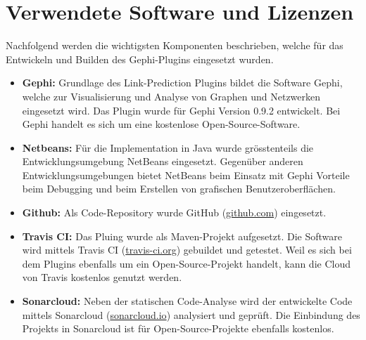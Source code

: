 \section{Verwendete Software und Lizenzen}

Nachfolgend werden die wichtigsten Komponenten beschrieben, welche für das Entwickeln und Builden des Gephi-Plugins eingesetzt wurden.

\begin{itemize}
    \item \textbf{Gephi:} Grundlage des Link-Prediction Plugins bildet die Software Gephi, welche zur Visualisierung und Analyse von Graphen und Netzwerken eingesetzt wird. Das Plugin wurde für Gephi Version 0.9.2 entwickelt. Bei Gephi handelt es sich um eine kostenlose Open-Source-Software. %
    \item \textbf{Netbeans:} Für die Implementation in Java wurde grösstenteils die Entwicklungsumgebung NetBeans eingesetzt. Gegenüber anderen Entwicklungsumgebungen bietet NetBeans beim Einsatz mit Gephi Vorteile beim Debugging und beim Erstellen von grafischen Benutzeroberflächen.
    \item \textbf{Github:} Als Code-Repository wurde GitHub (\href{http://github.com/}{github.com}) eingesetzt.
    \item \textbf{Travis CI:} Das Pluing wurde als Maven-Projekt aufgesetzt. Die Software wird mittels Travis CI (\href{http://travis-ci.org/}{travis-ci.org}) gebuildet und getestet. Weil es sich bei dem Plugins ebenfalls um ein Open-Source-Projekt handelt, kann die Cloud von Travis kostenlos genutzt werden.
    \item \textbf{Sonarcloud:} Neben der statischen Code-Analyse wird der entwickelte Code mittels Sonarcloud (\href{http://sonarcloud.io/}{sonarcloud.io}) analysiert und geprüft. Die Einbindung des Projekts in Sonarcloud ist für Open-Source-Projekte ebenfalls kostenlos.
\end{itemize}
